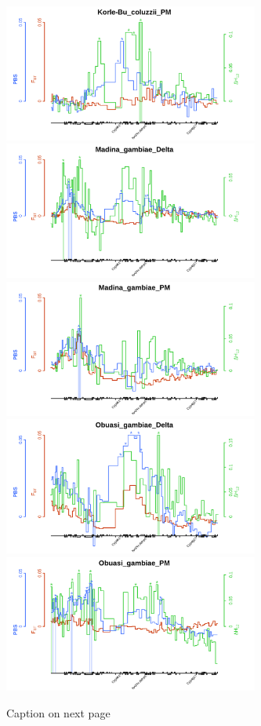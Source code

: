 \documentclass[a4paper,12pt]{article}
\begin{document}
\begin{figure}[h]
	\hspace{-0.3cm}\includegraphics*[width = 8.4cm]{../supplementary_cyp9k1_composite/Korle-Bu_coluzzii_PM_composite_plot.png}
	\vskip 0.4cm
	\hspace{-0.3cm}\includegraphics*[width = 8.4cm]{../supplementary_cyp9k1_composite/Madina_gambiae_Delta_composite_plot.png}
	\hspace{-0.3cm}\includegraphics*[width = 8.4cm]{../supplementary_cyp9k1_composite/Madina_gambiae_PM_composite_plot.png}
	\vskip 0.4cm
	\hspace{-0.3cm}\includegraphics*[width = 8.4cm]{../supplementary_cyp9k1_composite/Obuasi_gambiae_Delta_composite_plot.png}
	\hspace{-0.3cm}\includegraphics*[width = 8.4cm]{../supplementary_cyp9k1_composite/Obuasi_gambiae_PM_composite_plot.png}
	\caption{\footnotesize Caption on next page}
	\label{FigS8}
\end{figure}
\end{document}
